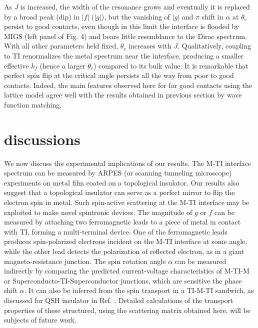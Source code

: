 \documentclass[12pt,twocolumn]{article}
\begin{document}
As $J$ is increased, the width of the resonance grows and eventually it is replaced by a 
broad peak (dip) in $|f|$ ($|g|$), but the vanishing of $|g|$ and $\pi$
shift in $\alpha$ at $\theta_c$ persist to good contacts,
even though in this limit the interface is flooded by MIGS (left panel of Fig. 4) 
and bears little resemblance to the Dirac spectrum.
With all other parameters held fixed, $\theta_c$ increases with $J$. Qualitatively,
coupling to TI renormalizes the metal spectrum near the interface, producing a smaller effective $k_f$ (hence a larger $\theta_c$) compared to its bulk value. 
It is remarkable that perfect spin flip at the critical angle persists all
the way from poor to good contacts. Indeed, the main features observed here for
for good contacts using the lattice model 
agree well with the results obtained in previous section by wave function matching. 

\section{discussions}

We now discuss the experimental implications of our results. The M-TI interface spectrum can be measured by 
ARPES (or scanning tunneling microscope) experiments on metal film coated on a topological insulator.
Our results also suggest that a topological insulator can serve as a perfect mirror to flip the 
electron spin in metal. Such spin-active scattering at the M-TI interface may be 
exploited to make novel spintronic devices. The magnitude of $g$ or $f$
can be measured by attaching two ferromagnetic leads to a piece of metal in contact with TI, 
forming a multi-terminal device. 
One of the ferromagnetic leads produces spin-polarized electrons incident on the M-TI interface at some angle, while 
the other lead detects the polarization of reflected electron, as in a
giant magneto-resistance junction. The spin rotation angle $\alpha$ can be measured 
indirectly by comparing the predicted current-voltage characteristics of M-TI-M 
or Superconducto-TI-Superconductor junctions, which are sensitive the phase shift $\alpha$. It can also be inferred from 
the spin transport in a TI-M-TI sandwich, as discussed for QSH insulator in Ref. \cite{yokoyama09}.
Detailed calculations of the transport properties of these structured,
using the scattering matrix obtained here, will be subjects of future work.

\clearpage
\end{document}
